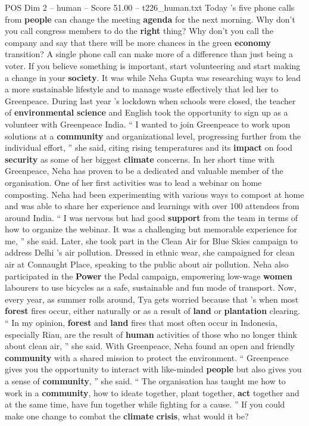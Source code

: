 \begin{textsample}{POS Dim 2 – human – Score 51.00 – t226\_human.txt}
Today ’s five phone calls from \textbf{people} can change the meeting \textbf{agenda} for the next morning.
Why don't you call congress members to do the \textbf{right} thing?
Why don't you call the company and say that there will be more chances in the green \textbf{economy} transition?
A single phone call can make more of a difference than just being a voter.
If you believe something is important, start volunteering and start making a change in your \textbf{society}.
It was while Neha Gupta was researching ways to lead a more sustainable lifestyle and to manage waste effectively that led her to Greenpeace.
During last year ’s lockdown when schools were closed, the teacher of \textbf{environmental} \textbf{science} and English took the opportunity to sign up as a volunteer with Greenpeace India. “ I wanted to join Greenpeace to work upon solutions at a \textbf{community} and organizational level, progressing further from the individual effort, ” she said, citing rising temperatures and its \textbf{impact} on food \textbf{security} as some of her biggest \textbf{climate} concerns.
In her short time with Greenpeace, Neha has proven to be a dedicated and valuable member of the organisation.
One of her first activities was to lead a webinar on home composting.
Neha had been experimenting with various ways to compost at home and was able to share her experience and learnings with over 100 attendees from around India. “ I was nervous but had good \textbf{support} from the team in terms of how to organize the webinar.
It was a challenging but memorable experience for me, ” she said.
Later, she took part in the Clean Air for Blue Skies campaign to address Delhi ’s air pollution.
Dressed in ethnic wear, she campaigned for clean air at Connaught Place, speaking to the public about air pollution.
Neha also participated in the \textbf{Power} the Pedal campaign, empowering low-wage \textbf{women} labourers to use bicycles as a safe, sustainable and fun mode of transport.
Now, every year, as summer rolls around, Tya gets worried because that ’s when most \textbf{forest} fires occur, either naturally or as a result of \textbf{land} or \textbf{plantation} clearing. “ In my opinion, \textbf{forest} and \textbf{land} fires that most often occur in Indonesia, especially Riau, are the result of \textbf{human} activities of those who no longer think about clean air, ” she said.
With Greenpeace, Neha found an open and friendly \textbf{community} with a shared mission to protect the environment. “ Greenpeace gives you the opportunity to interact with like-minded \textbf{people} but also gives you a sense of \textbf{community}, ” she said. “ The organisation has taught me how to work in a \textbf{community}, how to ideate together, plant together, \textbf{act} together and at the same time, have fun together while fighting for a cause. ” If you could make one change to combat the \textbf{climate} \textbf{crisis}, what would it be?

\end{textsample}
